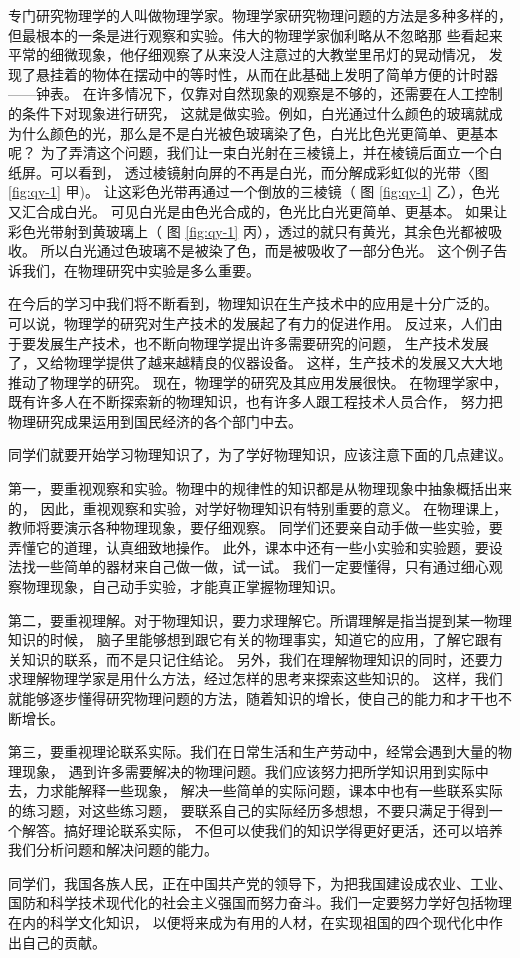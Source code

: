 专门研究物理学的人叫做物理学家。物理学家研究物理问题的方法是多种多样的，
但最根本的一条是进行观察和实验。伟大的物理学家伽利略从不忽略那
些看起来平常的细微现象，他仔细观察了从来没人注意过的大教堂里吊灯的晃动情况，
发现了悬挂着的物体在摆动中的等时性，从而在此基础上发明了简单方便的计时器——钟表。
在许多情况下，仅靠对自然现象的观察是不够的，还需要在人工控制的条件下对现象进行研究，
这就是做实验。例如，白光通过什么颜色的玻璃就成为什么颜色的光，那么是不是白光被色玻璃染了色，白光比色光更简单、更基本呢？
为了弄清这个问题，我们让一束白光射在三棱镜上，并在棱镜后面立一个白纸屏。可以看到，
透过棱镜射向屏的不再是白光，而分解成彩虹似的光带〈图 \ref{fig:qy-1} 甲)。
让这彩色光带再通过一个倒放的三棱镜（ 图 \ref{fig:qy-1} 乙），色光又汇合成白光。
可见白光是由色光合成的，色光比白光更简单、更基本。
如果让彩色光带射到黄玻璃上（ 图 \ref{fig:qy-1} 丙），透过的就只有黄光，其余色光都被吸收。
所以白光通过色玻璃不是被染了色，而是被吸收了一部分色光。
这个例子告诉我们，在物理研究中实验是多么重要。

在今后的学习中我们将不断看到，物理知识在生产技术中的应用是十分广泛的。
可以说，物理学的研究对生产技术的发展起了有力的促进作用。
反过来，人们由于要发展生产技术，也不断向物理学提出许多需要研究的问题，
生产技术发展了，又给物理学提供了越来越精良的仪器设备。
这样，生产技术的发展又大大地推动了物理学的研究。
现在，物理学的研究及其应用发展很快。
在物理学家中，既有许多人在不断探索新的物理知识，也有许多人跟工程技术人员合作，
努力把物理研究成果运用到国民经济的各个部门中去。

同学们就要开始学习物理知识了，为了学好物理知识，应该注意下面的几点建议。

第一，要重视观察和实验。物理中的规律性的知识都是从物理现象中抽象概括出来的，
因此，重视观察和实验，对学好物理知识有特别重要的意义。
在物理课上，教师将要演示各种物理现象，要仔细观察。
同学们还要亲自动手做一些实验，要弄懂它的道理，认真细致地操作。
此外，课本中还有一些小实验和实验题，要设法找一些简单的器材来自己做一做，试一试。
我们一定要懂得，只有通过细心观察物理现象，自己动手实验，才能真正掌握物理知识。

第二，要重视理解。对于物理知识，要力求理解它。所谓理解是指当提到某一物理知识的时候，
脑子里能够想到跟它有关的物理事实，知道它的应用，了解它跟有关知识的联系，而不是只记住结论。
另外，我们在理解物理知识的同时，还要力求理解物理学家是用什么方法，经过怎样的思考来探索这些知识的。
这样，我们就能够逐步懂得研究物理问题的方法，随着知识的增长，使自己的能力和才干也不断增长。

第三，要重视理论联系实际。我们在日常生活和生产劳动中，经常会遇到大量的物理现象，
遇到许多需要解决的物理问题。我们应该努力把所学知识用到实际中去，力求能解释一些现象，
解决一些简单的实际问题，课本中也有一些联系实际的练习题，对这些练习题，
要联系自己的实际经历多想想，不要只满足于得到一个解答。搞好理论联系实际，
不但可以使我们的知识学得更好更活，还可以培养我们分析问题和解决问题的能力。

同学们，我国各族人民，正在中国共产党的领导下，为把我国建设成农业、工业、
国防和科学技术现代化的社会主义强国而努力奋斗。我们一定要努力学好包括物理在内的科学文化知识，
以便将来成为有用的人材，在实现祖国的四个现代化中作出自己的贡献。

